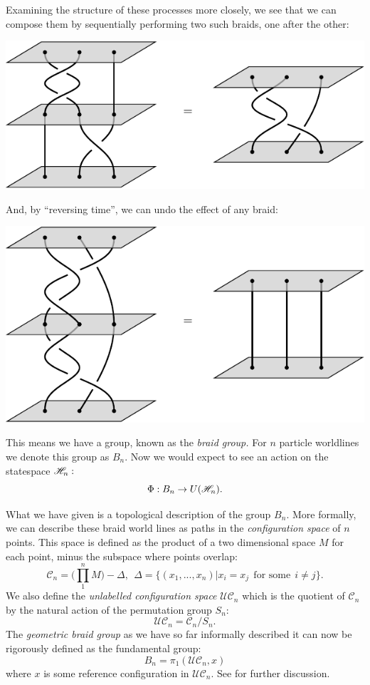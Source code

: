 \documentclass[aps, prl, letterpaper, twocolumn, superscriptaddress, notitlepage, 10pt]{revtex4-1}
\begin{document}
Examining the structure of these processes more closely,
we see that we can compose them by sequentially performing
two such braids, one after the other:
\begin{center}
\includegraphics[]{pic-braid-compose.pdf}
\end{center}
And, by ``reversing time'', we can undo the effect of
any braid:
\begin{center}
\includegraphics[]{pic-braid-inverse.pdf}
\end{center}
This means we have a group, known as the \emph{braid group.}
For $n$ particle worldlines we denote this group as $B_n.$
Now we would expect to see an action on the statespace $\mathscr{H}_n:$
$$
    \Phi : B_n \to U(\mathscr{H}_n).
$$

What we have given is a topological description of the group $B_n$.
More formally, we can describe these braid world lines as
paths in the \emph{configuration space} of $n$ points.
\newcommand{\Conf}{\mathcal{C}}
\newcommand{\UConf}{\mathcal{UC}}
This space is defined as the product of
a two dimensional space $M$ for each point, minus the subspace where points overlap:
$$
    \Conf_n = \bigl( \prod_{1}^{n} M \bigr) - \Delta, \ \ 
    \Delta = \{(x_1, ..., x_n) | x_i = x_j \ \ \mbox{for some} \ \ i\ne j \}.
$$
We also define the \emph{unlabelled configuration space}
$\UConf_n$ which is the quotient of $\Conf_n$ by the natural action of the
permutation group $S_n:$
$$
    \UConf_n = \Conf_n / S_n.
$$
The \emph{geometric braid group} as we have so far informally described it 
can now be rigorously defined as the fundamental group:
$$
    B_n = \pi_1 ( \UConf_n, x )
$$
where $x$ is some reference configuration in $\UConf_n.$
See \cite{Ghrist2014} for further discussion.
\end{document}
